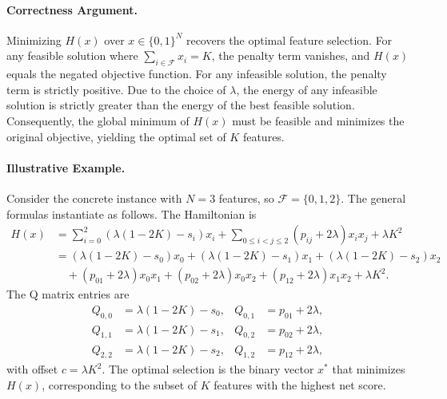 \documentclass[12pt]{article}
\begin{document}
\paragraph{Correctness Argument.}
Minimizing $H(x)$ over $x \in \{0, 1\}^N$ recovers the optimal feature selection. For any feasible solution where $\sum_{i \in \mathcal{F}} x_i = K$, the penalty term vanishes, and $H(x)$ equals the negated objective function. For any infeasible solution, the penalty term is strictly positive. Due to the choice of $\lambda$, the energy of any infeasible solution is strictly greater than the energy of the best feasible solution. Consequently, the global minimum of $H(x)$ must be feasible and minimizes the original objective, yielding the optimal set of $K$ features.

\paragraph{Illustrative Example.}
Consider the concrete instance with $N=3$ features, so $\mathcal{F} = \{0, 1, 2\}$. The general formulas instantiate as follows. The Hamiltonian is
\begin{align}
    H(x) &= \sum_{i=0}^{2} \left( \lambda(1 - 2K) - s_i \right) x_i + \sum_{0 \le i < j \le 2} \left( p_{ij} + 2\lambda \right) x_i x_j + \lambda K^2 \\
    &= \left( \lambda(1 - 2K) - s_0 \right) x_0 + \left( \lambda(1 - 2K) - s_1 \right) x_1 + \left( \lambda(1 - 2K) - s_2 \right) x_2 \nonumber \\
    &\quad + \left( p_{01} + 2\lambda \right) x_0 x_1 + \left( p_{02} + 2\lambda \right) x_0 x_2 + \left( p_{12} + 2\lambda \right) x_1 x_2 + \lambda K^2.
\end{align}
The Q matrix entries are
\begin{align}
    Q_{0,0} &= \lambda(1 - 2K) - s_0, & Q_{0,1} &= p_{01} + 2\lambda, \\
    Q_{1,1} &= \lambda(1 - 2K) - s_1, & Q_{0,2} &= p_{02} + 2\lambda, \\
    Q_{2,2} &= \lambda(1 - 2K) - s_2, & Q_{1,2} &= p_{12} + 2\lambda,
\end{align}
with offset $c = \lambda K^2$. The optimal selection is the binary vector $x^*$ that minimizes $H(x)$, corresponding to the subset of $K$ features with the highest net score.
\end{document}
